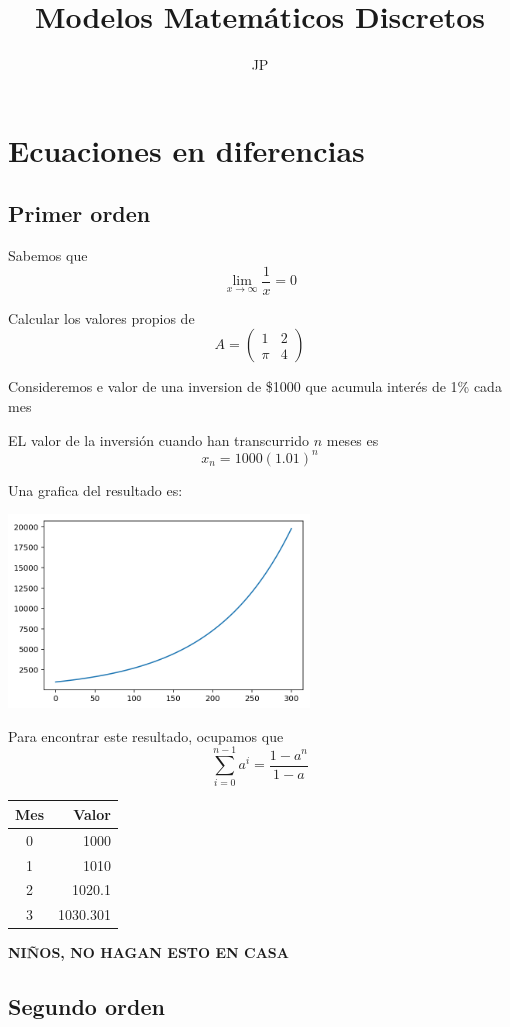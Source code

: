 \documentclass{article}
\title{Modelos Matemáticos Discretos}
\author{JP}
\begin{document}
\maketitle
\section{Ecuaciones en diferencias}
\subsection{Primer orden}

Sabemos que $$\lim_{x\to\infty}\frac{1}{x}=0$$

Calcular los valores propios de $$A=
\begin{pmatrix}
1 & 2 \\
\pi & 4
\end{pmatrix}
$$

Consideremos e valor de una inversion de \$1000 que acumula interés de 1\% cada mes

EL valor de la inversión cuando han transcurrido $n$ meses es $$x_n=1000(1.01)^n$$

Una grafica del resultado es:

\begin{center}
\includegraphics[width=8cm]{grafica}
\end{center}

Para encontrar este resultado, ocupamos que
$$\sum_{i=0}^{n-1}a^i=\frac{1-a^n}{1-a}$$

\begin{center}
\begin{tabular}{|c|r|}
\hline
Mes & Valor \\
\hline 
0 & 1000 \\
\hline 
1 & 1010 \\
\hline 
2 & 1020.1 \\
\hline 
3 & 1030.301 \\
\hline 
\end{tabular}

\huge
\textbf{NIÑOS, NO HAGAN ESTO EN CASA}
\end{center}

\subsection{Segundo orden}
\end{document}
